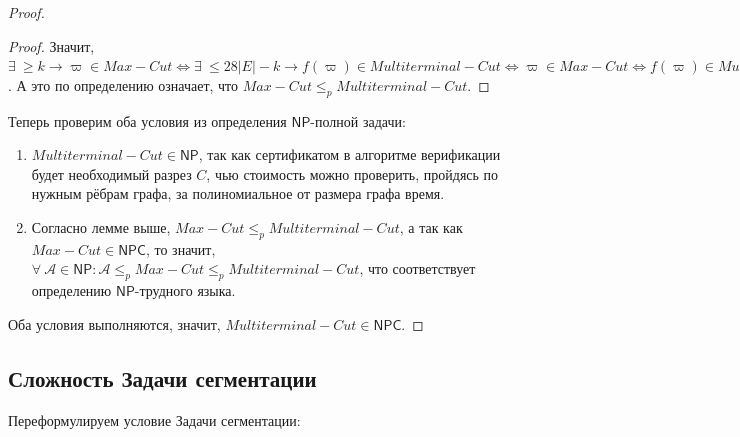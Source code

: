 \documentclass[a4paper,12pt]{article}
\newcommand{\NPclass}{\mathsf{NP}}
\newcommand{\NPCclass}{\mathsf{NPC}}
\begin{document}
\begin{proof}
\begin{proof}
        Значит, $\exists\ \geqslant k\to\varpi \in Max-Cut \iff \exists\ \leqslant 28|E| - k \to f(\varpi) \in Multiterminal-Cut \iff \varpi \in Max-Cut \Longleftrightarrow f(\varpi) \in Multiterminal-Cut$. А это по определению означает, что $Max-Cut \leqslant_p Multiterminal-Cut$.
    \end{proof}
    Теперь проверим оба условия из определения $\NPclass$-полной задачи:
    \begin{enumerate}
        \item $Multiterminal-Cut \in \NPclass$, так как сертификатом в алгоритме верификации будет необходимый разрез $C$, чью стоимость можно проверить, пройдясь по нужным рёбрам графа, за полиномиальное от размера графа время.
        \item Согласно лемме выше, $Max-Cut \leqslant_p Multiterminal-Cut$, а так как $Max-Cut \in \NPCclass$, то значит, $\forall\ \mathscr{A} \in \NPclass: \mathscr{A} \leqslant_p Max-Cut \leqslant_p Multiterminal-Cut$, что соответствует определению $\NPclass$-трудного языка.
    \end{enumerate}
    Оба условия выполняются, значит, $Multiterminal-Cut\in \NPCclass$.
\end{proof}

\subsection{Сложность Задачи сегментации}
Переформулируем условие Задачи сегментации:
\end{document}
